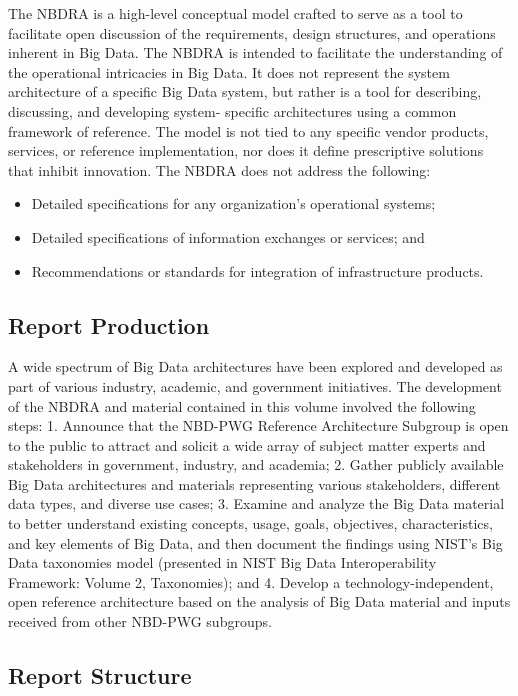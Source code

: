 \documentclass[11pt]{article}
\begin{document}
The NBDRA is a high-level conceptual model crafted to serve as a tool to facilitate open discussion of the 
requirements, design structures, and operations inherent in Big Data. The NBDRA is intended to facilitate 
the understanding of the operational intricacies in Big Data. It does not represent the system architecture 
of a specific Big Data system, but rather is a tool for describing, discussing, and developing system-
specific architectures using a common framework of reference. The model is not tied to any specific 
vendor products, services, or reference implementation, nor does it define prescriptive solutions that 
inhibit innovation. 
The NBDRA does not address the following:

\begin{itemize}
\item	Detailed specifications for any organization’s operational systems;
\item	Detailed specifications of information exchanges or services; and
\item	Recommendations or standards for integration of infrastructure products.
\end{itemize}


\subsection{Report Production }

A wide spectrum of Big Data architectures have been explored and developed as part of various industry, 
academic, and government initiatives. The development of the NBDRA and material contained in this 
volume involved the following steps:
1.	Announce that the NBD-PWG Reference Architecture Subgroup is open to the public to attract 
and solicit a wide array of subject matter experts and stakeholders in government, industry, and 
academia;
2.	Gather publicly available Big Data architectures and materials representing various stakeholders, 
different data types, and diverse use cases;  
3.	Examine and analyze the Big Data material to better understand existing concepts, usage, goals, 
objectives, characteristics, and key elements of Big Data, and then document the findings using 
NIST’s Big Data taxonomies model (presented in NIST Big Data Interoperability Framework: 
Volume 2, Taxonomies); and
4.	Develop a technology-independent, open reference architecture based on the analysis of Big Data 
material and inputs received from other NBD-PWG subgroups.

\subsection{Report Structure }
\end{document}
